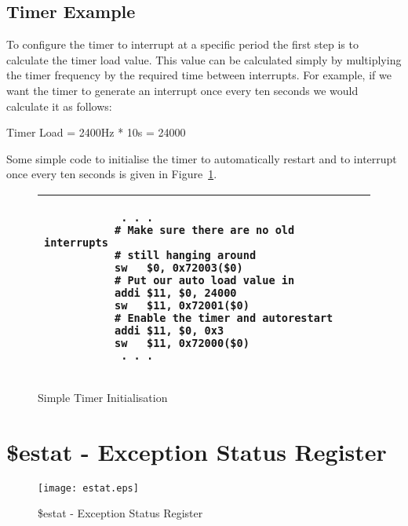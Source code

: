 \documentclass[a4paper,10pt]{article}
\begin{document}
\subsection{Timer Example}

To configure the timer to interrupt at a specific period the first
step is to calculate the timer load value. This value can be
calculated simply by multiplying the timer frequency by the required
time between interrupts. For example, if we want the timer to generate
an interrupt once every ten seconds we would calculate it as follows:

\begin{center}
Timer Load = 2400Hz * 10s = 24000
\end{center}

Some simple code to initialise the timer to automatically restart and
to interrupt once every ten seconds is given in
Figure~\ref{code:timer_init}.

\begin{figure}[h]
\begin{footnotesize}
\begin{center}
\begin{tabular}{|p{8cm}|}
\hline
\begin{verbatim}
            . . .
           # Make sure there are no old interrupts
           # still hanging around
           sw   $0, 0x72003($0)
           # Put our auto load value in
           addi $11, $0, 24000
           sw   $11, 0x72001($0)
           # Enable the timer and autorestart
           addi $11, $0, 0x3
           sw   $11, 0x72000($0)
            . . .
\end{verbatim}
\\
\hline
\end{tabular}
\end{center}
\end{footnotesize}
\caption{Simple Timer Initialisation}
\label{code:timer_init}
\end{figure}

\newpage
\section{\$estat - Exception Status Register}
\label{appen:estat}

\begin{figure}[h]
\begin{center}
\texttt{[image: estat.eps]}
\caption{\$estat - Exception Status Register}
\label{estat_pic}
\end{center}
\end{figure}
\end{document}

